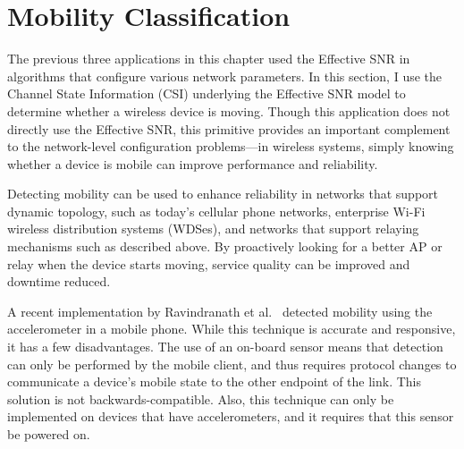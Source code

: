 \section{Mobility Classification}\label{sec:esnr_mobility}
The previous three applications in this chapter used the Effective SNR in algorithms that configure various network parameters. In this section, I use the Channel State Information (CSI) underlying the Effective SNR model to determine whether a wireless device is moving. Though this application does not directly use the Effective SNR, this primitive provides an important complement to the network-level configuration problems---in wireless systems, simply knowing whether a device is mobile can improve performance and reliability.

Detecting mobility can be used to enhance reliability in networks that support dynamic topology, such as today's cellular phone networks, enterprise Wi-Fi wireless distribution systems (WDSes), and networks that support relaying mechanisms such as described above. By proactively looking for a better AP or relay when the device starts moving, service quality can be improved and downtime reduced.

A recent implementation by Ravindranath et al.~\cite{Ravindranath_SensorHints} detected mobility using the accelerometer in a mobile phone. While this technique is accurate and responsive, it has a few disadvantages. The use of an on-board sensor means that detection can only be performed by the mobile client, and thus requires protocol changes to communicate a device's mobile state to the other endpoint of the link. This solution is not backwards-compatible. Also, this technique can only be implemented on devices that have accelerometers, and it requires that this sensor be powered on.

